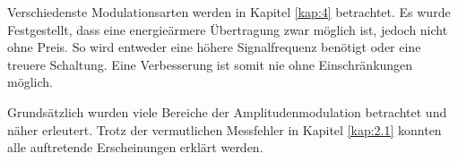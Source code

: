 \documentclass[12pt]{scrartcl}
\begin{document}
Verschiedenste Modulationsarten werden in Kapitel \ref{kap:4} betrachtet. 
Es wurde Festgestellt, dass eine energieärmere Übertragung zwar möglich ist, jedoch nicht ohne Preis. 
So wird entweder eine höhere Signalfrequenz benötigt oder eine treuere Schaltung. 
Eine Verbesserung ist somit nie ohne Einschränkungen möglich.
\bigskip

Grundsätzlich wurden viele Bereiche der Amplitudenmodulation betrachtet und näher erleutert. 
Trotz der vermutlichen Messfehler in Kapitel \ref{kap:2.1} konnten alle auftretende Erscheinungen erklärt werden.

\end{document}
